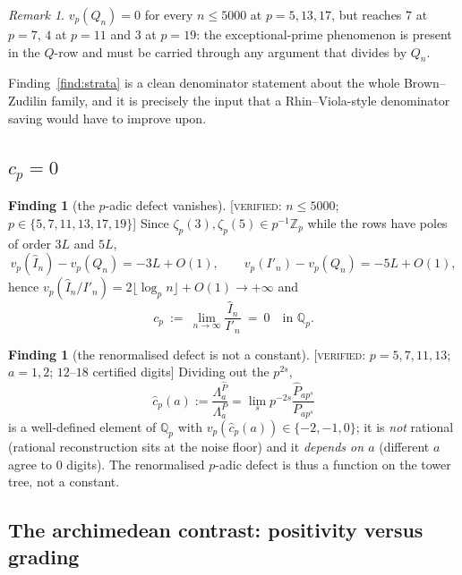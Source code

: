 \documentclass[11pt,reqno]{article}
\newcommand{\Qp}{\mathbb{Q}_p}
\newcommand{\Zp}{\mathbb{Z}_p}
\newcommand{\Ph}{\widehat{P}}
\newcommand{\Ih}{\widehat{I}}
\newcommand{\Ip}{I'}
\newcommand{\Lah}{\Lambda^{\Ph}}
\newcommand{\Lap}{\Lambda^{P}}
\newcommand{\vp}{v_p}
\newcommand{\floor}[1]{\lfloor #1 \rfloor}
\newcommand{\VER}[1]{{\normalfont\textsc{[verified:} #1\textsc{]}}}
\theoremstyle{plain}
\theoremstyle{definition}
\newtheorem{finding}[theorem]{Finding}
\theoremstyle{remark}
\newtheorem{remark}[theorem]{Remark}
\numberwithin{equation}{section}
\begin{document}
\begin{remark}\label{rem:Qvals}
$\vp(Q_n)=0$ for every $n\le5000$ at $p=5,13,17$, but reaches $7$ at $p=7$,
$4$ at $p=11$ and $3$ at $p=19$: the exceptional-prime phenomenon is present in
the $Q$-row and must be carried through any argument that divides by $Q_n$.
\end{remark}

Finding~\ref{find:strata} is a clean denominator statement about the whole
Brown--Zudilin family, and it is precisely the input that a Rhin--Viola-style
denominator saving \cite{RhinViola} would have to improve upon.

\subsection{$c_p=0$}\label{ss:cp}

\begin{finding}[the $p$-adic defect vanishes]\label{find:cp}
\VER{$n\le5000$; $p\in\{5,7,11,13,17,19\}$} Since
$\zeta_p(3),\zeta_p(5)\in p^{-1}\Zp$ while the rows have poles of order $3L$
and $5L$,
\[
  \vp(\Ih_n)-\vp(Q_n)=-3L+O(1),\qquad
  \vp(\Ip_n)-\vp(Q_n)=-5L+O(1),
\]
hence $\vp(\Ih_n/\Ip_n)=2\floor{\log_pn}+O(1)\to+\infty$ and
\[
  \boxed{\ c_p\ :=\ \lim_{n\to\infty}\frac{\Ih_n}{\Ip_n}\ =\ 0\quad\text{in }\Qp . \ }
\]
\end{finding}

\begin{finding}[the renormalised defect is not a constant]\label{find:chat}
\VER{$p=5,7,11,13$; $a=1,2$; $12$--$18$ certified digits} Dividing out the
$p^{2s}$,
\[
  \widehat{c}_p(a):=\frac{\Lah_a}{\Lap_a}
  =\lim_{s}p^{-2s}\frac{\Ph_{ap^s}}{P_{ap^s}}
\]
is a well-defined element of $\Qp$ with $\vp(\widehat{c}_p(a))\in\{-2,-1,0\}$;
it is \emph{not} rational (rational reconstruction sits at the noise floor) and
it \emph{depends on $a$} (different $a$ agree to $0$ digits).  The renormalised
$p$-adic defect is thus a function on the tower tree, not a constant.
\end{finding}

\subsection{The archimedean contrast: positivity versus grading}\label{ss:contrast}
\end{document}
